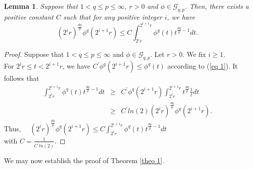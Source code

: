 \documentclass[a4paper,12pt,intlimits,oneside]{amsart}
\numberwithin{equation}{section}
\newtheorem{lemma}[theorem]{Lemma}
\numberwithin{equation}{section}
\theoremstyle{definition}
\begin{document}
\begin{lemma}\label{lem 1}
Suppose that $1 < q\leq p \leq \infty $, $r >0$ and $\phi \in \mathcal{G}_{q,p}$.  Then, there exists a positive constant $ C $ such that for any positive integer $i$, we have 
$$  (2^{i}r)^{\frac{dq}{p}} \phi^{q}(2^{i+1}r) \leq C \displaystyle\int_{2^{i}r}^{2^{i+1}r} \phi^{q}(t)t^{\frac{dq}{p}-1} dt .$$
\end{lemma}
\begin{proof}
Suppose  that $1 < q\leq p \leq \infty$ and $\phi \in \mathcal{G}_{q,p}$. Let  $r >0$. We fix $i \geq 1$.
\\ For $ 2^{i}r \leq t <  2^{i+1}r $, we have  $  C^{'} \phi^{q}(2^{i+1}r)  \leq  \phi^{q}(t)$ according to (\ref{eq 1}). It follows that
\begin{eqnarray*}
\displaystyle\int_{2^{i}r}^{2^{i+1}r} \phi^{q}(t)t^{\frac{dq}{p}-1} dt &\ge & C^{'} \phi^{q}(2^{i+1}r)\displaystyle\int_{2^{i}r}^{2^{i+1}r} t^{\frac{dq}{p}}\frac{1}{t} dt \\ &\geq & C^{'}ln(2) (2^{i}r)^{\frac{dq}{p}}\phi^{q}(2^{i+1}r).
\end{eqnarray*}
Thus, $\quad  (2^{i}r)^{\frac{dq}{p}} \phi^{q}(2^{i+1}r) \leq C \displaystyle\int_{2^{i}r}^{2^{i+1}r} \phi^{q}(t)t^{\frac{dq}{p}-1} dt$\\ with $C=\frac{1}{C^{'}ln(2)}$.  
\end{proof}
We may now establish the proof of Theorem \ref{theo 1}.
\end{document}

